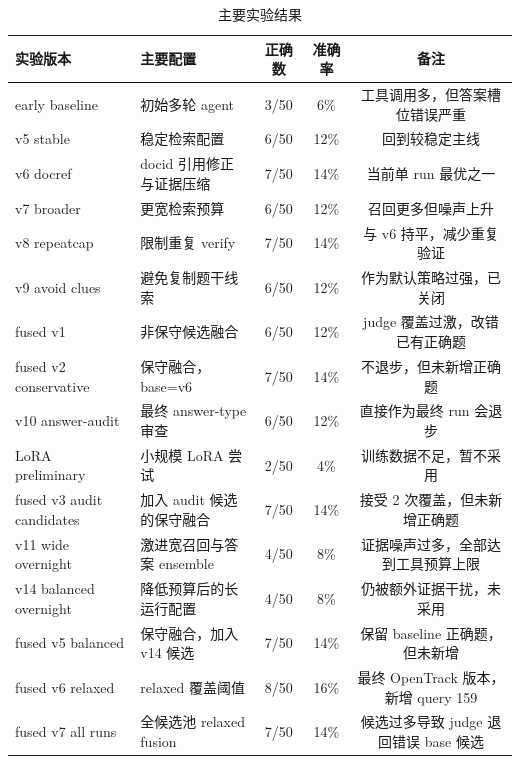 \documentclass[a4paper]{article}
\begin{document}
\begin{table}[h]
  \centering
  \scriptsize
  \begin{tabular}{|l|l|c|c|c|}
    \hline
    实验版本                      & 主要配置                & 正确数  & 准确率  & 备注                           \\
    \hline
    early baseline            & 初始多轮 agent          & 3/50 & 6\%  & 工具调用多，但答案槽位错误严重              \\
    \hline
    v5 stable                 & 稳定检索配置              & 6/50 & 12\% & 回到较稳定主线                      \\
    \hline
    v6 docref                 & docid 引用修正与证据压缩     & 7/50 & 14\% & 当前单 run 最优之一                 \\
    \hline
    v7 broader                & 更宽检索预算              & 6/50 & 12\% & 召回更多但噪声上升                    \\
    \hline
    v8 repeatcap              & 限制重复 verify         & 7/50 & 14\% & 与 v6 持平，减少重复验证               \\
    \hline
    v9 avoid clues            & 避免复制题干线索            & 6/50 & 12\% & 作为默认策略过强，已关闭                 \\
    \hline
    fused v1                  & 非保守候选融合             & 6/50 & 12\% & judge 覆盖过激，改错已有正确题           \\
    \hline
    fused v2 conservative     & 保守融合，base=v6        & 7/50 & 14\% & 不退步，但未新增正确题                  \\
    \hline
    v10 answer-audit          & 最终 answer-type 审查   & 6/50 & 12\% & 直接作为最终 run 会退步               \\
    \hline
    LoRA preliminary          & 小规模 LoRA 尝试         & 2/50 & 4\%  & 训练数据不足，暂不采用                  \\
    \hline
    fused v3 audit candidates & 加入 audit 候选的保守融合    & 7/50 & 14\% & 接受 2 次覆盖，但未新增正确题             \\
    \hline
    v11 wide overnight        & 激进宽召回与答案 ensemble   & 4/50 & 8\%  & 证据噪声过多，全部达到工具预算上限            \\
    \hline
    v14 balanced overnight    & 降低预算后的长运行配置         & 4/50 & 8\%  & 仍被额外证据干扰，未采用                 \\
    \hline
    fused v5 balanced         & 保守融合，加入 v14 候选      & 7/50 & 14\% & 保留 baseline 正确题，但未新增         \\
    \hline
    fused v6 relaxed          & relaxed 覆盖阈值        & 8/50 & 16\% & 最终 OpenTrack 版本，新增 query 159 \\
    \hline
    fused v7 all runs         & 全候选池 relaxed fusion & 7/50 & 14\% & 候选过多导致 judge 退回错误 base 候选    \\
    \hline
  \end{tabular}
  \caption{主要实验结果}
  \label{tab:results}
\end{table}
\end{document}
